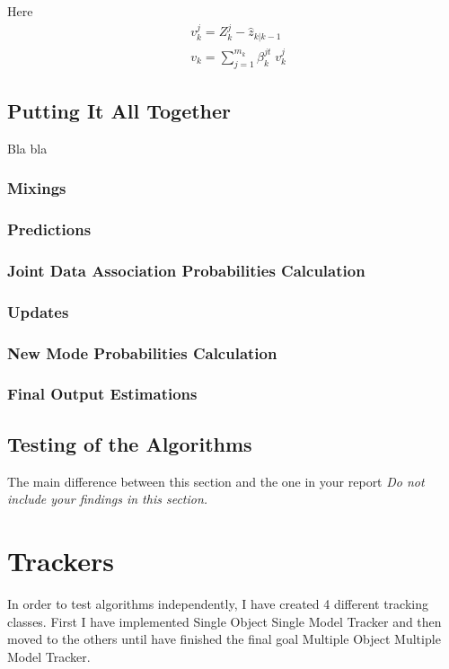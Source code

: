 \documentclass[peerreview]{IEEEtran}
\begin{document}
Here 
\begin{equation}
\begin{aligned}
&v^j_k = Z^j_k - \hat{z}_{k|k-1} \\
&v_k = \sum\limits_{j=1}^{m_k} \beta^{jt}_k \; v^j_k
\end{aligned}
\end{equation}



\subsection{Putting It All Together}
Bla bla

\subsubsection{Mixings}
\subsubsection{Predictions}
\subsubsection{Joint Data Association Probabilities Calculation}
\subsubsection{Updates}
\subsubsection{New Mode Probabilities Calculation}
\subsubsection{Final Output Estimations}


\subsection{Testing of the Algorithms}
The main difference between this section and the one in your report 
\emph{Do not include your findings in this section.}

\section{Trackers}
In order to test algorithms independently, I have created 4 different tracking classes. First I have implemented Single Object Single Model Tracker and then moved to the others until have finished the final goal Multiple Object Multiple Model Tracker.
\end{document}
